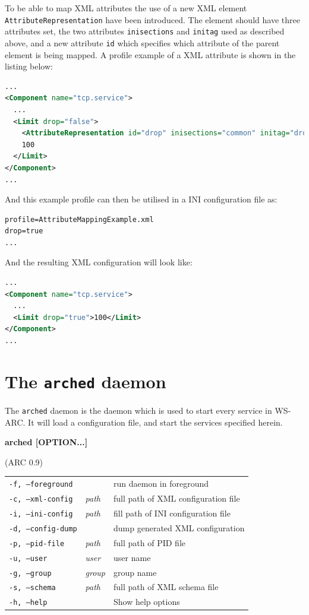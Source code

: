 \documentclass{article}
\begin{document}
To be able to map XML attributes the use of a new XML element
\texttt{AttributeRepresentation} have been introduced. The element should have
three attributes set, the two attributes \texttt{inisections} and
\texttt{initag} used as described above, and a new attribute \texttt{id} which
specifies which attribute of the parent element is being mapped. A profile
example of a XML attribute is shown in the listing below:
\begin{lstlisting}[language=xml,title=AttributeMapping.xml]
...
<Component name="tcp.service">
  ...
  <Limit drop="false">
    <AttributeRepresentation id="drop" inisections="common" initag="drop"/>
    100
  </Limit>
</Component>
...
\end{lstlisting}
And this example profile can then be utilised in a INI configuration file as:
\begin{lstlisting}[language=xml,title=AttributeMapping.ini]
profile=AttributeMappingExample.xml
drop=true
...
\end{lstlisting}
And the resulting XML configuration will look like:
\begin{lstlisting}[language=xml]
...
<Component name="tcp.service">
  ...
  <Limit drop="true">100</Limit>
</Component>
...
\end{lstlisting}

\section{The \texttt{arched} daemon}\label{sec:arched}
The \texttt{arched} daemon is the daemon which is used to start every service in
WS-ARC. It will load a configuration file, and start the services specified
herein.

\hspace*{0.5cm}
\begin{shaded}
\textbf{\sffamily arched [OPTION...]}
\end{shaded}
\vspace{-0.3cm}(ARC 0.9)\par
\begin{longtable}{llp{8cm}}
  \texttt{-f, --foreground} && run daemon in foreground\\
  \texttt{-c, --xml-config} & \textit{path} & full path of XML configuration file\\
  \texttt{-i, --ini-config} & \textit{path} & fill path of INI configuration file\\
  \texttt{-d, --config-dump} && dump generated XML configuration\\
  \texttt{-p, --pid-file} & \textit{path} & full path of PID file\\
  \texttt{-u, --user} & \textit{user} & user name\\
  \texttt{-g, --group} & \textit{group} & group name\\
  \texttt{-s, --schema} & \textit{path} & full path of XML schema file\\
  \texttt{-h, --help} && Show help options
\end{longtable}
\end{document}
